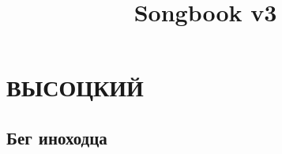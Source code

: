 \documentclass{memoir}
\title{Songbook v3}
\begin{document}
\tableofcontents[hideallsubsections]
\clearpage
\section{ВЫСОЦКИЙ}

\clearpage

{\huge
\subsection{Бег иноходца}

}
\end{document}
